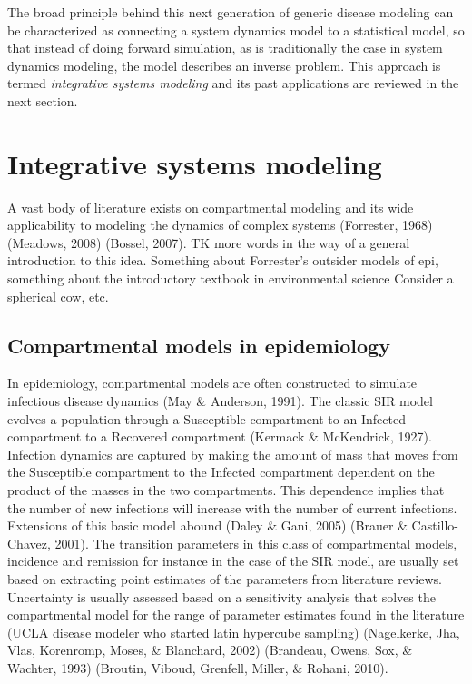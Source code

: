 The broad principle behind this next generation of generic disease
modeling can be characterized as connecting a system dynamics model to
a statistical model, so that instead of doing forward simulation, as
is traditionally the case in system dynamics modeling, the model
describes an inverse problem. This approach is termed \emph{integrative
systems modeling} and its past applications are reviewed in the next
section.

\section{Integrative systems modeling}
A vast body of literature exists on compartmental modeling and its
wide applicability to modeling the dynamics of complex systems
(Forrester, 1968) (Meadows, 2008) (Bossel, 2007).  TK more words in
the way of a general introduction to this idea.  Something about
Forrester's outsider models of epi, something about the introductory
textbook in environmental science Consider a spherical cow, etc.

\subsection{Compartmental models in epidemiology}
In epidemiology,
compartmental models are often constructed to simulate infectious
disease dynamics (May \& Anderson, 1991). The classic SIR model
evolves a population through a Susceptible compartment to an Infected
compartment to a Recovered compartment (Kermack \& McKendrick,
1927). Infection dynamics are captured by making the amount of mass
that moves from the Susceptible compartment to the Infected
compartment dependent on the product of the masses in the two
compartments. This dependence implies that the number of new
infections will increase with the number of current
infections. Extensions of this basic model abound (Daley \& Gani,
2005) (Brauer \& Castillo-Chavez, 2001). The transition parameters in
this class of compartmental models, incidence and remission for
instance in the case of the SIR model, are usually set based on
extracting point estimates of the parameters from literature
reviews. Uncertainty is usually assessed based on a sensitivity
analysis that solves the compartmental model for the range of
parameter estimates found in the literature (UCLA disease modeler who
started latin hypercube sampling) (Nagelkerke, Jha, Vlas, Korenromp,
Moses, \& Blanchard, 2002) (Brandeau, Owens, Sox, \& Wachter, 1993)
(Broutin, Viboud, Grenfell, Miller, \& Rohani, 2010). 

